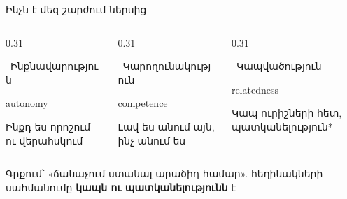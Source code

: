 \begin{frame}{Ինչն է մեզ շարժում ներսից}
  \par\smallskip
  \begin{columns}[T]
    \begin{column}{0.31\textwidth}
      \begin{card}[colback=mint!35!cardwhite]
        \ {\blackfont Ինքնավարություն}\par {\scriptsize autonomy}\par\smallskip
        Ինքդ ես որոշում ու վերահսկում
      \end{card}
    \end{column}
    \begin{column}{0.31\textwidth}
      \begin{card}[colback=butter!45!cardwhite]
        \ {\blackfont Կարողունակություն}\par {\scriptsize competence}\par\smallskip
        Լավ ես անում այն, ինչ անում ես
      \end{card}
    \end{column}
    \begin{column}{0.31\textwidth}
      \begin{card}[colback=lavender!35!cardwhite]
        \ {\blackfont Կապվածություն}\par {\scriptsize relatedness}\par\smallskip
        Կապ ուրիշների հետ, պատկանելություն*
      \end{card}
    \end{column}
  \end{columns}
  {\scriptsize * Գրքում՝ «ճանաչում ստանալ արածիդ համար». հեղինակների սահմանումը \textbf{կապն ու պատկանելությունն} է}
\end{frame}

